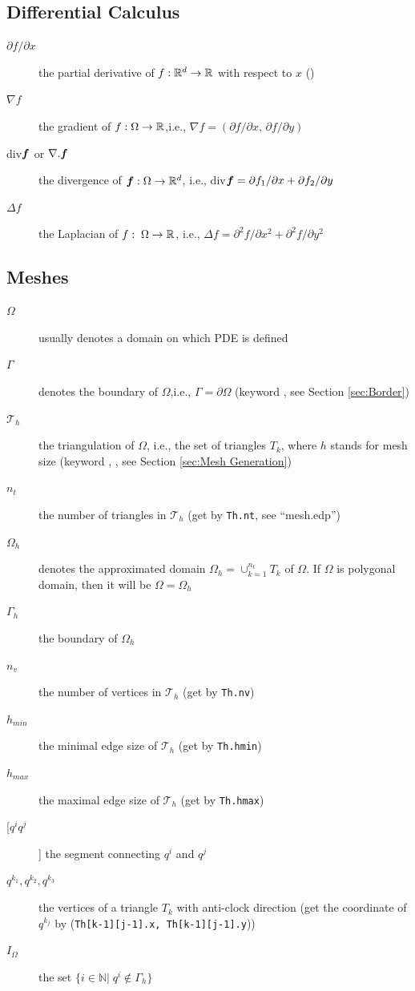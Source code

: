 \documentclass[a4paper,twoside,12pt]{book}
\def\vec#1{\mbox{\boldmath $#1$}}
\def\N{\mathbb{N}}
\def\p{\partial}
\def\refSec#1{Section \ref{sec:#1}}
\begin{document}
\subsection{Differential Calculus}
\begin{description}
  \item[$\p f/\p x$] the partial derivative of $f:\mathbb{R}^d\to \mathbb{R}$ with respect to $x$ ()
  \item[$\nabla f$] the gradient of $f:\Omega\to \mathbb{R}$,i.e., $\nabla f=(\p f/\p x,\, \p f/\p y)$
  \item[div$\vec{f}$ or $\nabla.\vec{f}$] the divergence of $\vec{f}:\Omega\to \R^d$, i.e., div$\vec{f}=\p f_1/\p x+\p f_2/\p y$
  \item[$\Delta f$] the Laplacian of $f:\; \Omega\to \mathbb{R}$, i.e.,
  $\Delta f=\p^2f/\p x^2+\p^2 f/\p y^2$
\end{description}

\subsection{Meshes}
\begin{description}
  \item[$\Omega$] usually denotes a domain on which PDE is defined
  \item[$\Gamma$] denotes the boundary of $\Omega$,i.e., $\Gamma=\p\Omega
$ (keyword , see \refSec{Border})
  \item[$\mathcal{T}_h$] the triangulation of $\Omega$, i.e., the set of triangles $T_k$, where $h$ stands for mesh size (keyword , , see \refSec{Mesh Generation})
  \item[$n_t$] the number of triangles in $\mathcal{T}_h$ (get by \texttt{Th.nt}, see ``mesh.edp'')
  \item[$\Omega_h$] denotes the approximated domain $\Omega_h=\cup_{k=1}^{n_t}T_k$ of $\Omega$. If $\Omega$ is polygonal domain, then it will be $\Omega=\Omega_h$
  \item[$\Gamma_h$] the boundary of $\Omega_h$
  \item[$n_v$] the number of vertices in $\mathcal{T}_h$ (get by \texttt{Th.nv})
  \item[$h_{min}$] the minimal edge size of $\mathcal{T}_h$ (get by \texttt{Th.hmin})
  \item[$h_{max}$] the maximal edge size of $\mathcal{T}_h$ (get by \texttt{Th.hmax}) 
  \item[[$q^iq^j$]] the segment connecting $q^i$ and $q^j$
  \item[$q^{k_1},q^{k_2},q^{k_3}$] the vertices of a triangle $T_k$ with anti-clock direction (get the coordinate of $q^{k_j}$ by
  (\texttt{Th[k-1][j-1].x, Th[k-1][j-1].y}))
  \item[$I_{\Omega}$] the set $\{i\in \N|\; q^i\not\in \Gamma_h\}$
  
\end{description}
\end{document}
